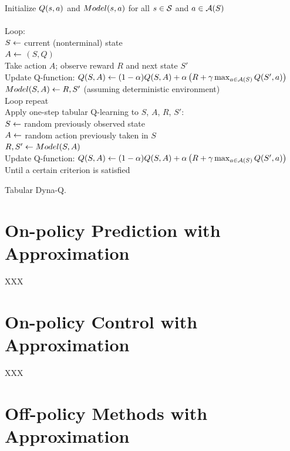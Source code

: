 \begin{table}
\beginalg
Initialize $Q(s,a)$ and $Model(s,a)$ for all $s\in\mathcal{S}$ and $a\in\mathcal{A}(S)$\\
\\
Loop:\\
\> $S \leftarrow$ current (nonterminal) state\\
\> $A \leftarrow$ \epsgreedy$(S,Q)$ \\
\> Take action $A$; observe reward $R$ and next state $S'$\\
\> Update Q-function: $Q(S,A) \leftarrow (1-\alpha) Q(S,A) + \alpha \left( R + \gamma \max_{a\in\mathcal{A}(S)}Q(S',a)\right)$\\
\> $Model(S,A) \leftarrow R, S'$ (assuming deterministic environment)\\
\> Loop repeat\\
\> Apply one-step tabular Q-learning to $S$, $A$, $R$, $S'$:\\
\> \> $S \leftarrow$ random previously observed state\\
\> \> $A \leftarrow$ random action previously taken in $S$\\
\> \> $R, S' \leftarrow Model(S,A)$\\
\> \> Update Q-function: $Q(S,A) \leftarrow (1-\alpha) Q(S,A) + \alpha \left( R + \gamma \max_{a\in\mathcal{A}(S)}Q(S',a) \right)$\\
Until a certain criterion is satisfied
\endalg
\caption{Tabular Dyna-Q.}
\label{tab:alg:tabular-dyna-q}
\end{table}


\section{On-policy Prediction with Approximation}

XXX

\section{On-policy Control with Approximation}

XXX

\section{Off-policy Methods with Approximation}

